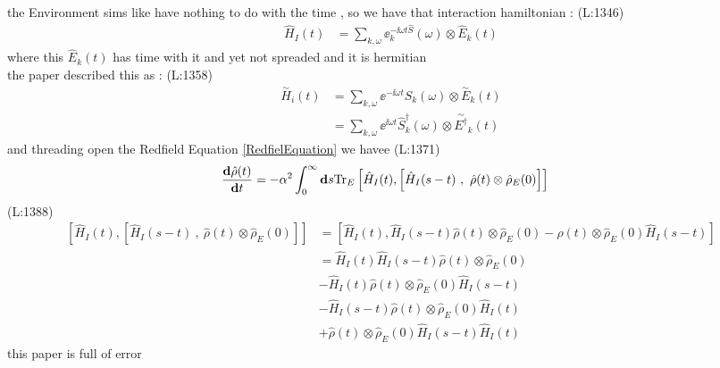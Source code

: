  the Environment sims like have nothing 
 to do with the time , 
 so we have that  interaction hamiltonian : 
(L:1346)
\begin{equation}
\begin{split}
\hat{H }_{I }(t )&=\sum _{k ,\omega }\ee ^{-\ii \omega t \hat{S }}_{k }(\omega )\otimes \hat{E }_{k }(t )\end{split}
\end{equation}
 where this 
 $ \hat{E }_{k }(t ) $  has time with it and yet not spreaded 
 and it is hermitian \\ 
 the paper described this as : 
(L:1358)
\begin{equation}
\begin{split}
\overset{\sim}{H }_{i }(t )&=\sum _{k ,\omega }\ee ^{-\ii \omega t }\hat{S }_{k }(\omega )\otimes \overset{\sim}{E }_{k }(t )\\
&=\sum _{k ,\omega }\ee ^{\ii \omega t }\hat{S }_{k }^\dagger (\omega )\otimes \overset{\sim}{E ^\dagger }_{k }(t )\end{split}
\end{equation}
 and threading open the Redfield Equation 
 \eqref{RedfielEquation} 
 we havee
(L:1371)
\begin{equation}
\begin{split}
\dfrac{\bold{d}\hat{\rho }(t )}{\bold{d}t }&=-\alpha ^{2}\int _{0}^{\infty }\bold{d}s \text{Tr}_{E }\left[\hat{H }_{I }(t ),\left[\hat{H }_{I }(s -t )\ ,\ \hat{\rho }(t )\otimes \hat{\rho }_{E }(0)\right]\right]\end{split}
\end{equation}
(L:1388)
\begin{equation}
\begin{split}
\left[\hat{H }_{I }(t ),\left[\hat{H }_{I }(s -t )\ ,\ \hat{\rho }(t )\otimes \hat{\rho }_{E }(0)\right]\right]&=\left[\hat{H }_{I }(t ),\hat{H }_{I }(s -t )\hat{\rho }(t )\otimes \hat{\rho }_{E }(0)-\hat{\rho }(t )\otimes \hat{\rho }_{E }(0)\hat{H }_{I }(s -t )\right]\\
&=\hat{H }_{I }(t )\hat{H }_{I }(s -t )\hat{\rho }(t )\otimes \hat{\rho }_{E }(0)\\
&-\hat{H }_{I }(t )\hat{\rho }(t )\otimes \hat{\rho }_{E }(0)\hat{H }_{I }(s -t )\\
&-\hat{H }_{I }(s -t )\hat{\rho }(t )\otimes \hat{\rho }_{E }(0)\hat{H }_{I }(t )\\
&+\hat{\rho }(t )\otimes \hat{\rho }_{E }(0)\hat{H }_{I }(s -t )\hat{H }_{I }(t )\end{split}
\end{equation}
 this paper is full of error
